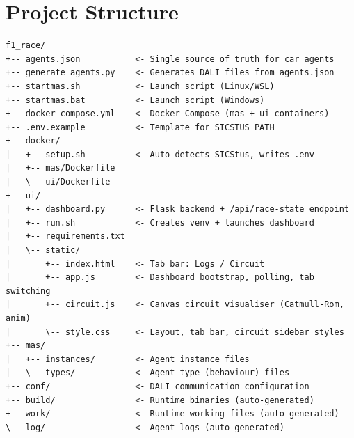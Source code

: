 \section{Project Structure}

\begin{lstlisting}[language={}, numbers=none, frame=none, backgroundcolor=\color{white},basicstyle=\ttfamily\scriptsize]
f1_race/
+-- agents.json           <- Single source of truth for car agents
+-- generate_agents.py    <- Generates DALI files from agents.json
+-- startmas.sh           <- Launch script (Linux/WSL)
+-- startmas.bat          <- Launch script (Windows)
+-- docker-compose.yml    <- Docker Compose (mas + ui containers)
+-- .env.example          <- Template for SICSTUS_PATH
+-- docker/
|   +-- setup.sh          <- Auto-detects SICStus, writes .env
|   +-- mas/Dockerfile
|   \-- ui/Dockerfile
+-- ui/
|   +-- dashboard.py      <- Flask backend + /api/race-state endpoint
|   +-- run.sh            <- Creates venv + launches dashboard
|   +-- requirements.txt
|   \-- static/
|       +-- index.html    <- Tab bar: Logs / Circuit
|       +-- app.js        <- Dashboard bootstrap, polling, tab switching
|       +-- circuit.js    <- Canvas circuit visualiser (Catmull-Rom, anim)
|       \-- style.css     <- Layout, tab bar, circuit sidebar styles
+-- mas/
|   +-- instances/        <- Agent instance files
|   \-- types/            <- Agent type (behaviour) files
+-- conf/                 <- DALI communication configuration
+-- build/                <- Runtime binaries (auto-generated)
+-- work/                 <- Runtime working files (auto-generated)
\-- log/                  <- Agent logs (auto-generated)
\end{lstlisting}

